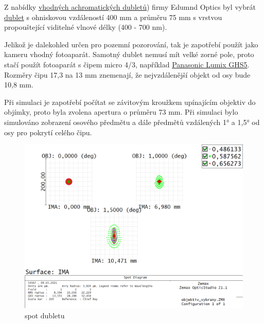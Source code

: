 \documentclass[
]{article}
\begin{document}
Z nabídky
\href{https://www.edmundoptics.com/c/achromatic-lenses/652/\#29374=29374_s\%3ANS4wMCAtIDUuOTk1\&29374=29374_s\%3ANC4wMCAtIDQuOTk1\&27560=27560_s\%3AVklTIDAmZGVnOyAoNDI1LTY3NW5tKQ2\&27560=27560_s\%3AVklTLU5JUiAoNDAwLTEwMDBubSk1\&27560=27560_s\%3ATWdGPHN1Yj4yPC9zdWI-ICg0MDAtNzAwbm0p0\&27560=27560_s\%3ATWdGPHN1Yj4yPC9zdWI-ICg0MDAtNzAwbm0p0\&27560=27560_s\%3AVklTIDAmZGVnOyAoNDI1LTY3NW5tKQ2\&27560=27560_s\%3AVklTLU5JUiAoNDAwLTEwMDBubSk1\&27560=27560_s\%3AVVYtVklTICgzNDUtNzAwbm0p0\&27614=27614_d\%3A\%5B59.18\%20TO\%2089.47\%5D}{vhodných
achromatických dubletů}) firmy Edumnd Optics byl vybrát
\href{https://www.edmundoptics.com/p/75mm-dia-x-400mm-fl-vis-0deg-coated-achromatic-lens/30848/}{dublet}
s ohniskovou vzdáleností 400 mm a průměru 75 mm s vrstvou propouštející
viditelné vlnové délky (400 - 700 nm).

Jelikož je dalekohled určen pro pozemní pozorování, tak je zapotřebí
použít jako kameru vhodný fotoaparát. Samotný dublet nemusí mít velké
zorné pole, proto stačí použít fotoaparát s čipem micro 4/3, například
\href{https://www.fotoskoda.cz/panasonic-lumix-dc-gh5s/}{Panasonic Lumix
GHS5}. Rozměry čipu 17,3 na 13 mm znemenají, že nejvzdálenější objekt od
osy bude 10,8 mm.

Při simulaci je zapotřebí počítat se závitovým kroužkem upínajícím
objektiv do objímky, proto byla zvolena apertura o průměru 73 mm. Při
simulaci bylo simulováno zobrazení osového předmětu a dále předmětů
vzdálených 1° a 1,5° od osy pro pokrytí celého čipu.

\begin{figure}
\centering
\includegraphics{imgs/SpotDiagram_dublet.png}
\caption{spot dubletu}
\end{figure}
\end{document}
